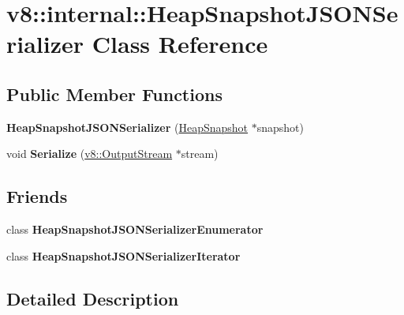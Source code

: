 \hypertarget{classv8_1_1internal_1_1HeapSnapshotJSONSerializer}{}\section{v8\+:\+:internal\+:\+:Heap\+Snapshot\+J\+S\+O\+N\+Serializer Class Reference}
\label{classv8_1_1internal_1_1HeapSnapshotJSONSerializer}
\subsection*{Public Member Functions}
\begin{DoxyCompactItemize}
\item 
\mbox{\label{classv8_1_1internal_1_1HeapSnapshotJSONSerializer_acc182676e6b29f094c62ecec8bb3ff5b}} 
{\bfseries Heap\+Snapshot\+J\+S\+O\+N\+Serializer} (\mbox{\hyperlink{classv8_1_1internal_1_1HeapSnapshot}{Heap\+Snapshot}} $\ast$snapshot)
\item 
\mbox{\label{classv8_1_1internal_1_1HeapSnapshotJSONSerializer_a0cc8e8e97d0a2df0df0f59342ec447a2}} 
void {\bfseries Serialize} (\mbox{\hyperlink{classv8_1_1OutputStream}{v8\+::\+Output\+Stream}} $\ast$stream)
\end{DoxyCompactItemize}
\subsection*{Friends}
\begin{DoxyCompactItemize}
\item 
\mbox{\label{classv8_1_1internal_1_1HeapSnapshotJSONSerializer_aa8f0fed181b2cbcc6d42bb03ef455db5}} 
class {\bfseries Heap\+Snapshot\+J\+S\+O\+N\+Serializer\+Enumerator}
\item 
\mbox{\label{classv8_1_1internal_1_1HeapSnapshotJSONSerializer_a8044648e3cab653e8d53f7d5d11eaa80}} 
class {\bfseries Heap\+Snapshot\+J\+S\+O\+N\+Serializer\+Iterator}
\end{DoxyCompactItemize}


\subsection{Detailed Description}



